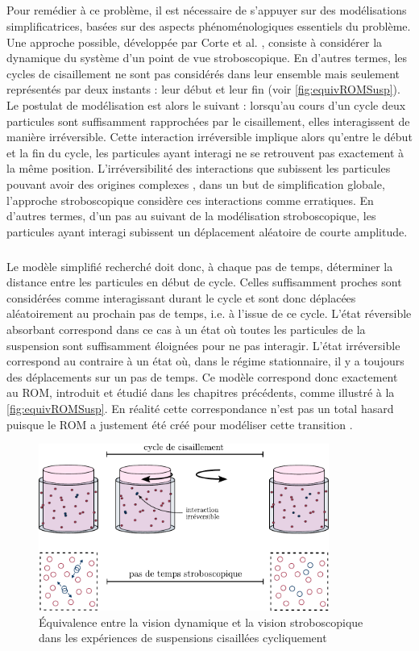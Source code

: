 \subparagraph{}Pour remédier à ce problème, il est nécessaire de s'appuyer sur des modélisations simplificatrices, basées sur des aspects phénoménologiques essentiels du problème. Une approche possible, développée par Corte et al. \cite{corte_random_2008}, consiste à considérer la dynamique du système d'un point de vue stroboscopique. En d'autres termes, les cycles de cisaillement ne sont pas considérés dans leur ensemble mais seulement représentés par deux instants : leur début et leur fin (voir \autoref{fig:equivROMSusp}). Le postulat de modélisation est alors le suivant : lorsqu'au cours d'un cycle deux particules sont suffisamment rapprochées par le cisaillement, elles interagissent de manière irréversible. Cette interaction irréversible implique alors qu'entre le début et la fin du cycle, les particules ayant interagi ne se retrouvent pas exactement à la même position. L'irréversibilité des interactions que subissent les particules pouvant avoir des origines complexes \cite{drazer_microstructure_2004}, dans un but de simplification globale, l'approche stroboscopique considère ces interactions comme erratiques. En d'autres termes, d'un pas au suivant de la modélisation stroboscopique, les particules ayant interagi subissent un déplacement aléatoire de courte amplitude.

\subparagraph{}Le modèle simplifié recherché doit donc, à chaque pas de temps, déterminer la distance entre les particules en début de cycle. Celles suffisamment proches sont considérées comme interagissant durant le cycle et sont donc déplacées aléatoirement au prochain pas de temps, i.e. à l’issue de ce cycle. L'état réversible absorbant correspond dans ce cas à un état où toutes les particules de la suspension sont suffisamment éloignées pour ne pas interagir. L'état irréversible correspond au contraire à un état où, dans le régime stationnaire, il y a toujours des déplacements sur un pas de temps. Ce modèle correspond donc exactement au ROM, introduit et étudié dans les chapitres précédents, comme illustré à la \autoref{fig:equivROMSusp}. En réalité cette correspondance n'est pas un total hasard puisque le ROM a justement été créé pour modéliser cette transition \cite{corte_random_2008}.

\begin{figure}[h]
	\centering
	\includegraphics[width=0.85\textwidth]{Chapitre3/Figures/Method/equivROMSusp.pdf}
	\caption{Équivalence entre la vision dynamique et la vision stroboscopique dans les expériences de suspensions cisaillées cycliquement}
	\label{fig:equivROMSusp}
\end{figure}

